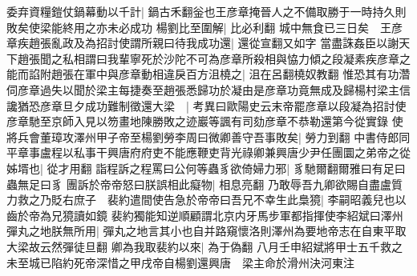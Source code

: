 委弃資糧鎧仗鍋幕動以千計|{
	鍋古禾翻釡也王彦章掩晉人之不備取勝于一時持久則敗矣使梁能終用之亦未必成功}
楊劉比至圍解|{
	比必利翻}
城中無食已三日矣　王彦章疾趙張亂政及為招討使謂所親曰待我成功還|{
	還從宣翻又如字}
當盡誅姦臣以謝天下趙張聞之私相謂曰我輩寧死於沙陀不可為彦章所殺相與恊力傾之段凝素疾彦章之能而諂附趙張在軍中與彦章動相違戾百方沮橈之|{
	沮在呂翻橈奴教翻}
惟恐其有功濳伺彦章過失以聞於梁主每捷奏至趙張悉歸功於凝由是彦章功竟無成及歸楊村梁主信讒猶恐彦章旦夕成功難制徵還大梁　|{
	考異曰歐陽史云末帝罷彦章以段凝為招討使彦章馳至京師入見以笏畫地陳勝敗之迹巖等諷有司劾彦章不恭勒還第今從實錄}
使將兵會董璋攻澤州甲子帝至楊劉勞李周曰微卿善守吾事敗矣|{
	勞力到翻}
中書侍郎同平章事盧程以私事干興唐府府吏不能應鞭吏背光祿卿兼興唐少尹任團圜之弟帝之從姊壻也|{
	從才用翻}
詣程訴之程罵曰公何等蟲豸欲倚婦力邪|{
	豸馳爾翻爾雅曰有足曰蟲無足曰豸}
團訴於帝帝怒曰朕誤相此癡物|{
	相息亮翻}
乃敢辱吾九卿欲賜自盡盧質力救之乃貶右庶子　裴約遣間使告急於帝帝曰吾兄不幸生此梟獍|{
	李嗣昭義兒也以齒於帝為兄獍讀如鏡}
裴約獨能知逆順顧謂北京内牙馬步軍都指揮使李紹斌曰澤州彈丸之地朕無所用|{
	彈丸之地言其小也自并路窺懷洛則澤州為要地帝志在自東平取大梁故云然彈徒旦翻}
卿為我取裴約以來|{
	為于偽翻}
八月壬申紹斌將甲士五千救之未至城已陷約死帝深惜之甲戌帝自楊劉還興唐　梁主命於滑州決河東注

